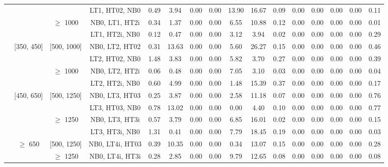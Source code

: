 \begin{sidewaystable}[ht]
\begin{center}
\begin{tabular}{|c | c | c | c | c | c | c | c | c | c | c | c | c | c | c | c | }
  &  &  &LT1, HT02, NB0 & 0.49 & 3.94 & 0.00 & 0.00 & 13.90 & 16.67 & 0.09 & 0.00 & 0.00 & 0.00 & 0.00 & 0.11 \\ 
\cline{3-16}  & & $\geq$ 1000 &NB0, LT1, HT2i & 0.34 & 1.37 & 0.00 & 0.00 & 6.55 & 10.88 & 0.12 & 0.00 & 0.00 & 0.00 & 0.00 & 0.01 \\ 
  &  &  &LT1, HT2i, NB0 & 0.12 & 0.47 & 0.00 & 0.00 & 3.12 & 3.94 & 0.02 & 0.00 & 0.00 & 0.00 & 0.00 & 0.29 \\ 
\cline{2-16}   & [350, 450] & [500, 1000]&NB0, LT2, HT02 & 0.31 & 13.63 & 0.00 & 0.00 & 5.60 & 26.27 & 0.15 & 0.00 & 0.00 & 0.00 & 0.00 & 0.46 \\ 
  &  &  &LT2, HT02, NB0 & 1.48 & 3.83 & 0.00 & 0.00 & 5.82 & 3.70 & 0.27 & 0.00 & 0.00 & 0.00 & 0.00 & 0.39 \\ 
\cline{3-16}  & & $\geq$ 1000 &NB0, LT2, HT2i & 0.06 & 0.48 & 0.00 & 0.00 & 7.05 & 3.10 & 0.03 & 0.00 & 0.00 & 0.00 & 0.00 & 0.04 \\ 
  &  &  &LT2, HT2i, NB0 & 0.60 & 4.99 & 0.00 & 0.00 & 1.48 & 15.39 & 0.37 & 0.00 & 0.00 & 0.00 & 0.00 & 0.17 \\ 
\cline{2-16}   & [450, 650] & [500, 1250]&NB0, LT3, HT03 & 0.25 & 3.87 & 0.00 & 0.00 & 2.58 & 11.18 & 0.07 & 0.00 & 0.00 & 0.00 & 0.00 & 0.76 \\ 
  &  &  &LT3, HT03, NB0 & 0.78 & 13.02 & 0.00 & 0.00 & 0.00 & 4.40 & 0.10 & 0.00 & 0.00 & 0.00 & 0.00 & 0.77 \\ 
\cline{3-16}  & & $\geq$ 1250 &NB0, LT3, HT3i & 0.57 & 3.79 & 0.00 & 0.00 & 6.85 & 16.01 & 0.02 & 0.00 & 0.00 & 0.00 & 0.00 & 0.15 \\ 
  &  &  &LT3, HT3i, NB0 & 1.31 & 0.41 & 0.00 & 0.00 & 7.79 & 18.45 & 0.19 & 0.00 & 0.00 & 0.00 & 0.00 & 0.03 \\ 
\cline{2-16}   & $\geq$ 650 & [500, 1250]&NB0, LT4i, HT03 & 0.39 & 10.35 & 0.00 & 0.00 & 0.34 & 13.07 & 0.15 & 0.00 & 0.00 & 0.00 & 0.00 & 0.28 \\ 
\cline{3-16}  & & $\geq$ 1250 &NB0, LT4i, HT3i & 0.28 & 2.85 & 0.00 & 0.00 & 9.79 & 12.65 & 0.08 & 0.00 & 0.00 & 0.00 & 0.00 & 0.08 \\ 
 \hline 
\hline 
\end{tabular} 
\end{center} 
\end{sidewaystable} 
